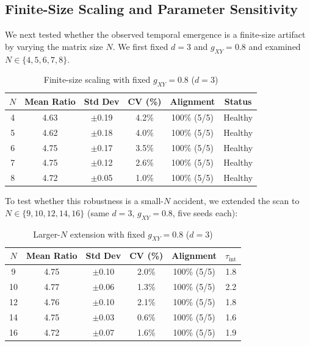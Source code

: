 \documentclass[12pt,a4paper]{article}
\begin{document}
\subsection{Finite-Size Scaling and Parameter Sensitivity}\label{sec:fss}

We next tested whether the observed temporal emergence is a finite-size
artifact by varying the matrix size $N$. We first fixed $d=3$ and
$g_{XY}=0.8$ and examined $N \in \{4,5,6,7,8\}$.

\begin{table}[ht]
\centering
\caption{Finite-size scaling with fixed $g_{XY}=0.8$ ($d=3$)}
\label{tab:fss_fixed}
\begin{tabular}{cccccc}
\toprule
$N$ & Mean Ratio & Std Dev & CV (\%) & Alignment & Status \\
\midrule
4 & 4.63 & $\pm$0.19 & 4.2\% & 100\% (5/5) & Healthy \\
5 & 4.62 & $\pm$0.18 & 4.0\%  & 100\% (5/5) & Healthy \\
6 & 4.75 & $\pm$0.17 & 3.5\%  & 100\% (5/5) & Healthy \\
7 & 4.75 & $\pm$0.12 & 2.6\%  & 100\% (5/5) & Healthy \\
8 & 4.72 & $\pm$0.05 & 1.0\%  & 100\% (5/5) & Healthy \\
\bottomrule
\end{tabular}
\end{table}

To test whether this robustness is a small-$N$ accident, we extended the scan
to $N \in \{9, 10, 12, 14, 16\}$ (same $d=3$, $g_{XY}=0.8$, five seeds each):

\begin{table}[ht]
\centering
\caption{Larger-$N$ extension with fixed $g_{XY}=0.8$ ($d=3$)}
\label{tab:fss_large_n}
\begin{tabular}{cccccc}
\toprule
$N$ & Mean Ratio & Std Dev & CV (\%) & Alignment & $\tau_{\mathrm{int}}$ \\
\midrule
9  & 4.75 & $\pm$0.10 & 2.0\% & 100\% (5/5) & 1.8 \\
10 & 4.77 & $\pm$0.06 & 1.3\% & 100\% (5/5) & 2.2 \\
12 & 4.76 & $\pm$0.10 & 2.1\% & 100\% (5/5) & 1.8 \\
14 & 4.75 & $\pm$0.03 & 0.6\% & 100\% (5/5) & 1.6 \\
16 & 4.72 & $\pm$0.07 & 1.6\% & 100\% (5/5) & 1.9 \\
\bottomrule
\end{tabular}
\end{table}
\end{document}
